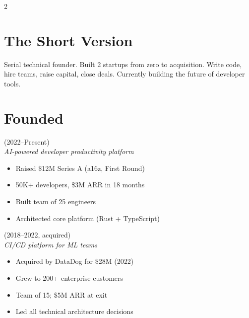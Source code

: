 \documentclass[11pt,a4paper]{article}
\begin{document}
\noindent
{}

\vspace{0.5em}

\begin{multicols}{2}

\section{The Short Version}
Serial technical founder. Built 2 startups from zero to acquisition. Write code, hire teams, raise capital, close deals. Currently building the future of developer tools.

\section{Founded}

 {\small (2022--Present)}\\
\textit{AI-powered developer productivity platform}
\begin{itemize}[leftmargin=0.8em,nosep,label={\color{accent}\textbf{/}}]
\item Raised \$12M Series A (a16z, First Round)
\item 50K+ developers, \$3M ARR in 18 months
\item Built team of 25 engineers
\item Architected core platform (Rust + TypeScript)
\end{itemize}
\vspace{0.4em}

 {\small (2018--2022, acquired)}\\
\textit{CI/CD platform for ML teams}
\begin{itemize}[leftmargin=0.8em,nosep,label={\color{accent}\textbf{/}}]
\item Acquired by DataDog for \$28M (2022)
\item Grew to 200+ enterprise customers
\item Team of 15; \$5M ARR at exit
\item Led all technical architecture decisions
\end{itemize}


\end{multicols}
\end{document}
